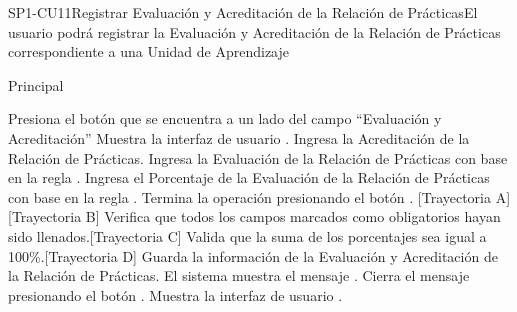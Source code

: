 \begin{UseCase}{SP1-CU11}{Registrar Evaluación y Acreditación de la Relación de Prácticas}{El usuario podrá registrar la Evaluación y Acreditación de la Relación de Prácticas correspondiente a una Unidad de Aprendizaje}

\end{UseCase}

\begin{UCtrayectoria}{Principal}
    
    \UCpaso[\UCactor] Presiona el botón \BtnModal que se encuentra a un lado del campo ``Evaluación y Acreditación'' 
    \UCpaso Muestra la interfaz de usuario .
    \UCpaso[\UCactor] Ingresa la Acreditación de la Relación de Prácticas.
    \UCpaso[\UCactor] Ingresa la Evaluación de la Relación de Prácticas con base en la regla .
    \UCpaso[\UCactor] Ingresa el Porcentaje de la Evaluación de la Relación de Prácticas con base en la regla .
    \UCpaso[\UCactor] Termina la operación presionando el botón . [Trayectoria A][Trayectoria B]
    \UCpaso Verifica que todos los campos marcados como obligatorios hayan sido llenados.[Trayectoria C]
    \UCpaso Valida que la suma de los porcentajes sea igual a 100\%.[Trayectoria D]
    \UCpaso Guarda la información de la Evaluación y Acreditación de la Relación de Prácticas.
    \UCpaso El sistema muestra el mensaje .
    \UCpaso[\UCactor] Cierra el mensaje presionando el botón . 
    \UCpaso Muestra la interfaz de usuario  .
\end{UCtrayectoria}

